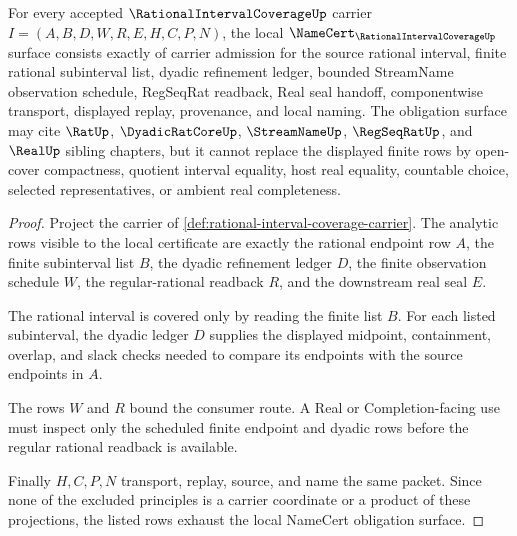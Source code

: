 \begin{theorem}
\label{thm:rational-interval-coverage-namecert-obligations}
For every accepted $\RationalIntervalCoverageUp$ carrier $I=(A,B,D,W,R,E,H,C,P,N)$, the local $\NameCert_{\RationalIntervalCoverageUp}$ surface consists exactly of carrier admission for the source rational interval, finite rational subinterval list, dyadic refinement ledger, bounded StreamName observation schedule, RegSeqRat readback, Real seal handoff, componentwise transport, displayed replay, provenance, and local naming. The obligation surface may cite $\RatUp$, $\DyadicRatCoreUp$, $\StreamNameUp$, $\RegSeqRatUp$, and $\RealUp$ sibling chapters, but it cannot replace the displayed finite rows by open-cover compactness, quotient interval equality, host real equality, countable choice, selected representatives, or ambient real completeness.
\end{theorem}
\begin{proof}
Project the carrier of \autoref{def:rational-interval-coverage-carrier}. The analytic rows visible to the local certificate are exactly the rational endpoint row $A$, the finite subinterval list $B$, the dyadic refinement ledger $D$, the finite observation schedule $W$, the regular-rational readback $R$, and the downstream real seal $E$.

The rational interval is covered only by reading the finite list $B$. For each listed subinterval, the dyadic ledger $D$ supplies the displayed midpoint, containment, overlap, and slack checks needed to compare its endpoints with the source endpoints in $A$.

The rows $W$ and $R$ bound the consumer route. A Real or Completion-facing use must inspect only the scheduled finite endpoint and dyadic rows before the regular rational readback is available.

Finally $H,C,P,N$ transport, replay, source, and name the same packet. Since none of the excluded principles is a carrier coordinate or a product of these projections, the listed rows exhaust the local NameCert obligation surface.
\end{proof}

